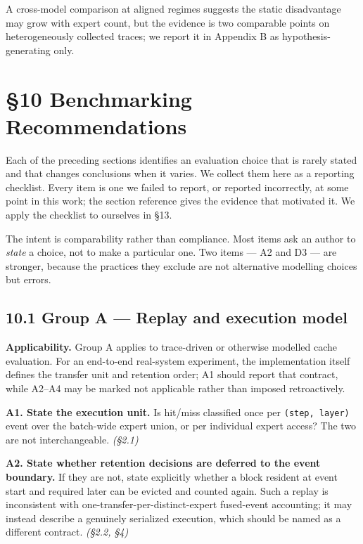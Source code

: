 \documentclass[
  10pt,
  letterpaper,
  10pt]{article}
\begin{document}
A cross-model comparison at aligned regimes suggests the static
disadvantage may grow with expert count, but the evidence is two
comparable points on heterogeneously collected traces; we report it in
Appendix B as hypothesis-generating only.

\section{§10 Benchmarking
Recommendations}\label{benchmarking-recommendations}

Each of the preceding sections identifies an evaluation choice that is
rarely stated and that changes conclusions when it varies. We collect
them here as a reporting checklist. Every item is one we failed to
report, or reported incorrectly, at some point in this work; the section
reference gives the evidence that motivated it. We apply the checklist
to ourselves in §13.

The intent is comparability rather than compliance. Most items ask an
author to \emph{state} a choice, not to make a particular one. Two items
--- A2 and D3 --- are stronger, because the practices they exclude are
not alternative modelling choices but errors.

\subsection{10.1 Group A --- Replay and execution
model}\label{group-a-replay-and-execution-model}

\textbf{Applicability.} Group A applies to trace-driven or otherwise
modelled cache evaluation. For an end-to-end real-system experiment, the
implementation itself defines the transfer unit and retention order; A1
should report that contract, while A2--A4 may be marked not applicable
rather than imposed retroactively.

\textbf{A1. State the execution unit.} Is hit/miss classified once per
\texttt{(step,\ layer)} event over the batch-wide expert union, or per
individual expert access? The two are not interchangeable. \emph{(§2.1)}

\textbf{A2. State whether retention decisions are deferred to the event
boundary.} If they are not, state explicitly whether a block resident at
event start and required later can be evicted and counted again. Such a
replay is inconsistent with one-transfer-per-distinct-expert fused-event
accounting; it may instead describe a genuinely serialized execution,
which should be named as a different contract. \emph{(§2.2, §4)}
\end{document}

